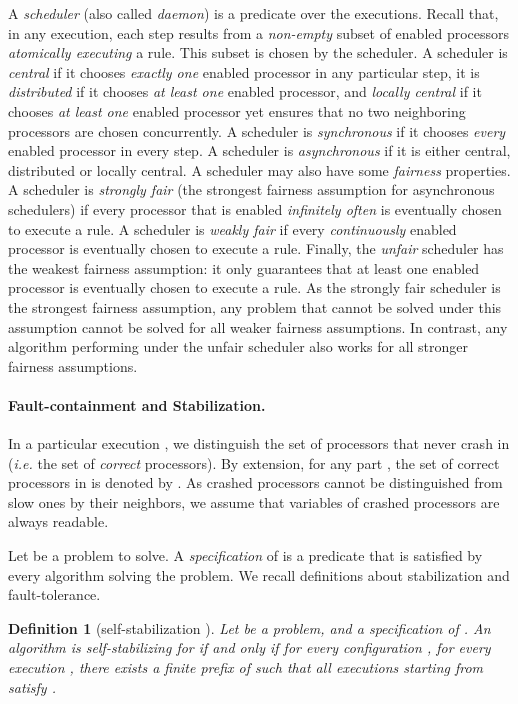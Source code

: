 \documentclass[11pt,english,letterpaper]{article}
\newtheorem{definition}{Definition}
\begin{document}
A \emph{scheduler} (also called \emph{daemon}) is a predicate over the executions. Recall that, in any execution, each step  results from a \emph{non-empty} subset of enabled processors \emph{atomically executing} a rule. This subset is chosen by the scheduler. A scheduler is \emph{central} if it chooses \emph{exactly one} enabled processor in any particular step, it is \emph{distributed} if it chooses \emph{at least one} enabled processor, and \emph{locally central} if it chooses \emph{at least one} enabled processor yet ensures that no two neighboring processors are chosen concurrently. A scheduler is \emph{synchronous} if it chooses \emph{every} enabled processor in every step. A scheduler is \emph{asynchronous} if it is either central, distributed or locally central. A scheduler may also have some \emph{fairness} properties. A scheduler is \emph{strongly fair} (the strongest fairness assumption for asynchronous schedulers) if every processor that is enabled \emph{infinitely often} is eventually chosen to execute a rule. A scheduler is \emph{weakly fair} if every \emph{continuously} enabled processor is eventually chosen to execute a rule. Finally, the \emph{unfair} scheduler has the weakest fairness assumption: it only guarantees that at least one enabled processor is eventually chosen to execute a rule. As the strongly fair scheduler is the strongest fairness assumption, any problem that cannot be solved under this assumption cannot be solved for all weaker fairness assumptions. In contrast, any algorithm performing under the unfair scheduler also works for all stronger fairness assumptions. 

\paragraph{Fault-containment and Stabilization.} In a particular execution , we distinguish the set of processors  that never crash in  (\emph{i.e.} the set of \emph{correct} processors). By extension, for any part , the set of correct processors in  is denoted by . As crashed processors cannot be distinguished from slow ones by their neighbors, we assume that variables of crashed processors are always readable. 

Let  be a problem to solve. A \emph{specification} of  is a predicate that is satisfied by every algorithm solving the problem. We recall definitions about stabilization and fault-tolerance.

\begin{definition} [self-stabilization \cite{D74j}] \label{def:self}
Let  be a problem, and  a specification of . An algorithm  is self-stabilizing for  if and only if for every configuration  , for every execution , there exists a finite prefix  of  such that all executions starting from  satisfy .
\end{definition}
\end{document}
